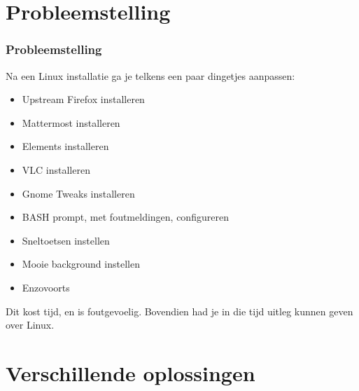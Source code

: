 \documentclass{beamer}
\begin{document}
\section{Probleemstelling}


\begin{frame}
\frametitle{Probleemstelling}
Na een Linux installatie ga je telkens een paar dingetjes aanpassen:
\begin{itemize}
  \item Upstream Firefox installeren
  \item Mattermost installeren
  \item Elements installeren
  \item VLC installeren
  \item Gnome Tweaks installeren
  \item BASH prompt, met foutmeldingen, configureren
  \item Sneltoetsen instellen
  \item Mooie background instellen
  \item Enzovoorts
\end{itemize}
Dit kost tijd, en is foutgevoelig. Bovendien had je in die tijd uitleg kunnen geven over Linux.
\end{frame}

\section{Verschillende oplossingen}
\end{document}

